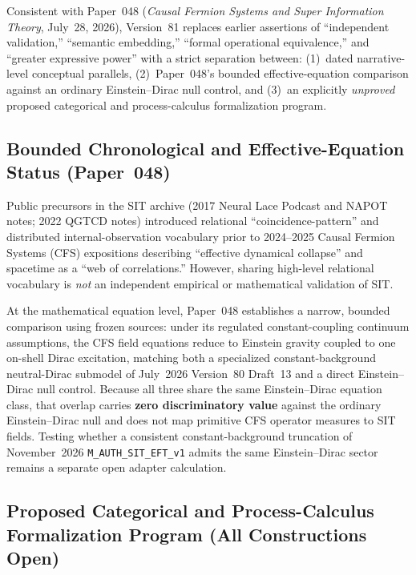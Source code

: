 Consistent with Paper~048 (\emph{Causal Fermion Systems and Super Information Theory}, July~28, 2026), Version~81 replaces earlier assertions of ``independent validation,'' ``semantic embedding,'' ``formal operational equivalence,'' and ``greater expressive power'' with a strict separation between: (1)~dated narrative-level conceptual parallels, (2)~Paper~048's bounded effective-equation comparison against an ordinary Einstein--Dirac null control, and (3)~an explicitly \emph{unproved} proposed categorical and process-calculus formalization program.

\subsection{Bounded Chronological and Effective-Equation Status (Paper~048)}

Public precursors in the SIT archive (2017 Neural Lace Podcast and NAPOT notes; 2022 QGTCD notes) introduced relational ``coincidence-pattern'' and distributed internal-observation vocabulary prior to 2024--2025 Causal Fermion Systems (CFS) expositions describing ``effective dynamical collapse'' and spacetime as a ``web of correlations.'' However, sharing high-level relational vocabulary is \emph{not} an independent empirical or mathematical validation of SIT.

At the mathematical equation level, Paper~048 establishes a narrow, bounded comparison using frozen sources: under its regulated constant-coupling continuum assumptions, the CFS field equations reduce to Einstein gravity coupled to one on-shell Dirac excitation, matching both a specialized constant-background neutral-Dirac submodel of July~2026 Version~80 Draft~13 and a direct Einstein--Dirac null control. Because all three share the same Einstein--Dirac equation class, that overlap carries \textbf{zero discriminatory value} against the ordinary Einstein--Dirac null and does not map primitive CFS operator measures to SIT fields. Testing whether a consistent constant-background truncation of November~2026 \texttt{M\_AUTH\_SIT\_EFT\_v1} admits the same Einstein--Dirac sector remains a separate open adapter calculation.

\subsection{Proposed Categorical and Process-Calculus Formalization Program (All Constructions Open)}

